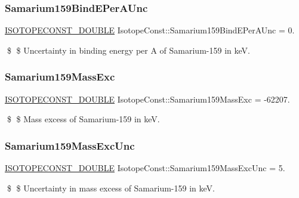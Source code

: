 \subsubsection{\texorpdfstring{Samarium159\+Bind\+E\+Per\+A\+Unc}{Samarium159BindEPerAUnc}}
{\footnotesize\ttfamily \mbox{\hyperlink{group___isotope_const-_macros_ga8f45a7272ce02c0b4c65c44636ed719a}{I\+S\+O\+T\+O\+P\+E\+C\+O\+N\+S\+T\+\_\+\+D\+O\+U\+B\+LE}} Isotope\+Const\+::\+Samarium159\+Bind\+E\+Per\+A\+Unc = 0.}

\$ \$ Uncertainty in binding energy per A of Samarium-\/159 in keV. \mbox{\label{group___isotope_const-_samarium-_sm159_gaa6500eb0140a0c4eb2531cea0b9c4ed6}} 
\subsubsection{\texorpdfstring{Samarium159\+Mass\+Exc}{Samarium159MassExc}}
{\footnotesize\ttfamily \mbox{\hyperlink{group___isotope_const-_macros_ga8f45a7272ce02c0b4c65c44636ed719a}{I\+S\+O\+T\+O\+P\+E\+C\+O\+N\+S\+T\+\_\+\+D\+O\+U\+B\+LE}} Isotope\+Const\+::\+Samarium159\+Mass\+Exc = -\/62207.}

\$ \$ Mass excess of Samarium-\/159 in keV. \mbox{\label{group___isotope_const-_samarium-_sm159_ga4a75ea413d07bb563084ab6178910064}} 
\subsubsection{\texorpdfstring{Samarium159\+Mass\+Exc\+Unc}{Samarium159MassExcUnc}}
{\footnotesize\ttfamily \mbox{\hyperlink{group___isotope_const-_macros_ga8f45a7272ce02c0b4c65c44636ed719a}{I\+S\+O\+T\+O\+P\+E\+C\+O\+N\+S\+T\+\_\+\+D\+O\+U\+B\+LE}} Isotope\+Const\+::\+Samarium159\+Mass\+Exc\+Unc = 5.}

\$ \$ Uncertainty in mass excess of Samarium-\/159 in keV. \mbox{\label{group___isotope_const-_samarium-_sm159_gabe4d16adec9ccd27754b73c731197a11}} 
